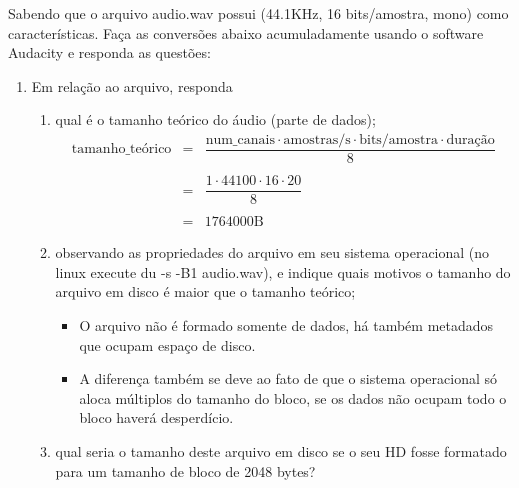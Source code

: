 \documentclass[12pt, a4paper, oneside]{abntex2}
\renewcommand{\theenumi}{\Alph*}
\renewcommand{\theenumii}{\roman*}
\begin{document}
    \printcoverufsc

    Sabendo que o arquivo audio.wav possui (44.1KHz, 16 bits/amostra, mono) como características.
    Faça as conversões abaixo acumuladamente usando o software Audacity e responda as questões:

    \begin{enumerate}[ref=\theenumi]
        \item\label{item:A} Em relação ao arquivo, responda
            \begin{enumerate}[ref=\theenumi.\theenumii]
                \item qual é o tamanho teórico do áudio (parte de dados);
                    \[
                    \begin{matrix}
                        \text{tamanho\_teórico} & = & \dfrac{\text{num\_canais} \cdot \text{amostras/s} \cdot \text{bits/amostra} \cdot \text{duração}}{8} \\ \\
                        & = &   \dfrac{1 \cdot 44100 \cdot 16 \cdot 20}{8} \\ \\
                        & = &   1764000\text{B}
                    \end{matrix}
                    \]
                \item\label{subitem:ii} observando as propriedades do arquivo em seu sistema
                    operacional (no linux execute du -s -B1 audio.wav),
                    e indique quais motivos o tamanho do arquivo em disco é maior que o tamanho teórico;
                    \begin{itemize}
                        \item O arquivo não é formado somente de dados, há também metadados que ocupam espaço de disco.
                        \item A diferença também se deve ao fato de que o sistema operacional só aloca múltiplos do tamanho do bloco, se os dados não ocupam todo o bloco haverá desperdício.
                    \end{itemize}
                \item qual seria o tamanho deste arquivo em disco se o seu HD fosse formatado para um tamanho de bloco de 2048 bytes?


\end{enumerate}
\end{enumerate}
\end{document}
